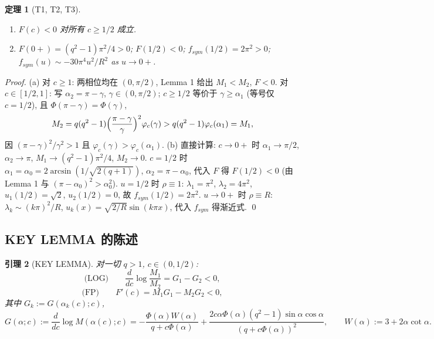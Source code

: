 \documentclass[UTF8]{ctexart}
\newtheorem{theorem}{定理}[section]
\newtheorem{lemma}[theorem]{引理}
\begin{document}
\begin{theorem}[T1, T2, T3]
\label{thm:T123}
\begin{enumerate}[label=(\alph*)]
	\item $F(c)<0$ 对所有 $c\ge1/2$ 成立.
	\item $F(0+)=(q^2-1)\pi^2/4>0$; $F(1/2)<0$; $f_{sym}(1/2)=2\pi^2>0$;
	$f_{sym}(u)\sim-30\pi^4u^2/R^2$ as $u\to0+$.
\end{enumerate}
\end{theorem}
\begin{proof}
(a) 对 $c\ge1$: 两相位均在 $(0,\pi/2)$, Lemma 1 给出 $M_1<M_2$, $F<0$.
对 $c\in[1/2,1]$: 写 $\alpha_2=\pi-\gamma$, $\gamma\in(0,\pi/2)$; $c\ge1/2$ 等价于
$\gamma\ge\alpha_1$ (等号仅 $c=1/2$), 且 $\Phi(\pi-\gamma)=\Phi(\gamma)$,
\begin{equation}
	M_2=q(q^2-1)\Bigl(\frac{\pi-\gamma}{\gamma}\Bigr)^2\varphi_c(\gamma)
	>q(q^2-1)\varphi_c(\alpha_1)=M_1,
\end{equation}
因 $(\pi-\gamma)^2/\gamma^2>1$ 且 $\varphi_c(\gamma)>\varphi_c(\alpha_1)$.
(b) 直接计算: $c\to0+$ 时 $\alpha_1\to\pi/2$, $\alpha_2\to\pi$, $M_1\to(q^2-1)\pi^2/4$,
$M_2\to0$. $c=1/2$ 时 $\alpha_1=\alpha_0=2\arcsin(1/\sqrt{2(q+1)})$,
$\alpha_2=\pi-\alpha_0$, 代入 $F$ 得 $F(1/2)<0$ (由 Lemma 1 与 $(\pi-\alpha_0)^2>\alpha_0^2$).
$u=1/2$ 时 $\rho\equiv1$: $\lambda_1=\pi^2$, $\lambda_2=4\pi^2$, $u_1(1/2)=\sqrt2$,
$u_2(1/2)=0$, 故 $f_{sym}(1/2)=2\pi^2$. $u\to0+$ 时 $\rho\equiv R$:
$\lambda_k\sim(k\pi)^2/R$, $u_k(x)=\sqrt{2/R}\sin(k\pi x)$, 代入 $f_{sym}$ 得渐近式. \qed
\end{proof}

\subsection{KEY LEMMA 的陈述}

\begin{lemma}[KEY LEMMA]
\label{lem:keylemma}
对一切 $q>1$, $c\in(0,1/2)$:
\begin{equation}
	\text{(LOG)}\qquad \frac{d}{dc}\log\frac{M_1}{M_2}=G_1-G_2<0,
\end{equation}
\begin{equation}
	\text{(FP)}\qquad F'(c)=M_1G_1-M_2G_2<0,
\end{equation}
其中 $G_k:=G(\alpha_k(c);c)$,
\begin{equation}
	G(\alpha;c):=\frac{d}{dc}\log M(\alpha(c);c)
	=-\frac{\Phi(\alpha)W(\alpha)}{q+c\Phi(\alpha)}
	+\frac{2c\alpha\Phi(\alpha)(q^2-1)\sin\alpha\cos\alpha}{(q+c\Phi(\alpha))^2},
	\qquad W(\alpha):=3+2\alpha\cot\alpha.
\end{equation}
\end{lemma}
\end{document}
